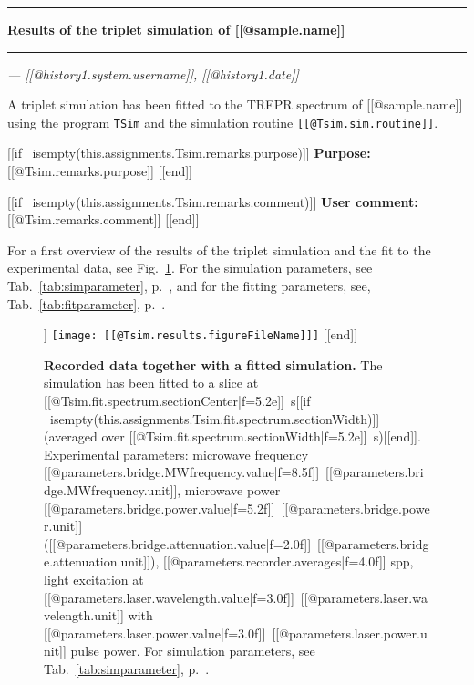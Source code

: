 \documentclass{article}
\newcommand*{\command}[1]{\texttt{#1}}
\begin{document}
\thispagestyle{empty}

\vspace*{-1.5cm}

\noindent\rule[1.5ex]{\textwidth}{1pt}

\begin{sffamily}\bfseries\large
Results of the triplet simulation of [[@sample.name]]
\end{sffamily}

\noindent\rule{\textwidth}{1pt}

\begin{flushright}\slshape
--- [[@history{1}.system.username]], [[@history{1}.date]]
\end{flushright}

\vspace*{1.5em}

A triplet simulation has been fitted to the TREPR spectrum of [[@sample.name]] using the program \command{TSim} and the simulation routine \command{[[@Tsim.sim.routine]]}.

[[if ~isempty(this.assignments.Tsim.remarks.purpose)]]
\textbf{Purpose:} [[@Tsim.remarks.purpose]]
[[end]]

[[if ~isempty(this.assignments.Tsim.remarks.comment)]]
\textbf{User comment:} [[@Tsim.remarks.comment]]
[[end]]

For a first overview of the results of the triplet simulation and the fit to the experimental data, see Fig.~\ref{fig:results}. For the simulation parameters, see Tab.~\ref{tab:simparameter}, p.~\pageref{tab:simparameter}, and for the fitting parameters, see, Tab.~\ref{tab:fitparameter}, p.~\pageref{tab:fitparameter}.


\begin{figure}[h]
\centering
[[if ~isempty(this.assignments.Tsim.results.figureFileName)]]
\texttt{[image: [[@Tsim.results.figureFileName]]]}
[[end]]
\caption{\textbf{Recorded data together with a fitted simulation.} The simulation has been fitted to a slice at  [[@Tsim.fit.spectrum.sectionCenter|f=5.2e]]~s[[if ~isempty(this.assignments.Tsim.fit.spectrum.sectionWidth)]] (averaged over [[@Tsim.fit.spectrum.sectionWidth|f=5.2e]]~s)[[end]]. Experimental parameters: microwave frequency [[@parameters.bridge.MWfrequency.value|f=8.5f]]~[[@parameters.bridge.MWfrequency.unit]], microwave power [[@parameters.bridge.power.value|f=5.2f]]~[[@parameters.bridge.power.unit]] ([[@parameters.bridge.attenuation.value|f=2.0f]]~[[@parameters.bridge.attenuation.unit]]), [[@parameters.recorder.averages|f=4.0f]] spp, light excitation at  [[@parameters.laser.wavelength.value|f=3.0f]]~[[@parameters.laser.wavelength.unit]] with [[@parameters.laser.power.value|f=3.0f]]~[[@parameters.laser.power.unit]] pulse power. For simulation parameters, see Tab.~\ref{tab:simparameter}, p.~\pageref{tab:simparameter}.}
\label{fig:results}
\end{figure}
\end{document}
